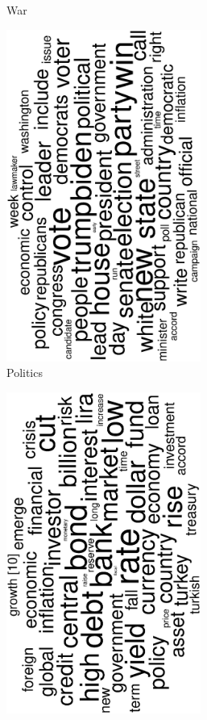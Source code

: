 \begin{figure}
\begin{subfigure}{0.32\textwidth}
		\caption{War}
	\end{subfigure}
	\begin{subfigure}{0.32\textwidth}
		\includegraphics[width=0.7\textwidth,angle=270]{figures/wordcloud11.eps}
		\caption{Politics}
	\end{subfigure}
	\begin{subfigure}{0.32\textwidth}
		\includegraphics[width=0.7\textwidth,angle=270]{figures/wordcloud12.eps}

\end{subfigure}
\end{figure}
